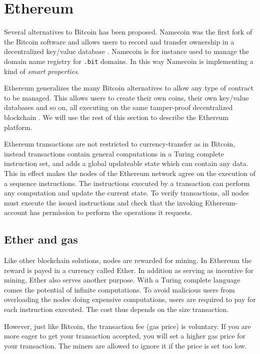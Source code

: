 \documentclass[oneside,a4paper,10pts,article]{memoir}
\begin{document}
\section{Ethereum}
Several alternatives to Bitcoin has been proposed. Namecoin was the
first fork of the Bitcoin software and allows users to record and
transfer ownership in a decentralized key/value database
\cite{namecoin}. Namecoin is for instance used to manage the domain
name registry for \texttt{.bit} domains. In this way Namecoin is
implementing a kind of \textit{smart properties}.

Ethereum generalizes the many Bitcoin alternatives to allow any type
of contract to be managed. This allows users to create their own
coins, their own key/value databases and so on, all executing on the
same tamper-proof decentralized blockchain \cite{buterin2013ethereum,
  wood2014ethereum}. We will use the rest of this section to describe
the Ethereum platform.

Ethereum transactions are not restricted to currency-transfer as in
Bitcoin, instead transactions contain general computations in a Turing
complete instruction set, and adds a global updateable state which can
contain any data. This in effect makes the nodes of the Ethereum
network agree on the execution of a sequence instructions. The
instructions executed by a transaction can perform any computation and
update the current state. To verify transactions, all nodes must
execute the issued instructions and check that the invoking
Ethereum-account has permission to perform the operations it requests.

\subsection{Ether and gas}
Like other blockchain solutions, nodes are rewarded for mining. In
Ethereum the reward is payed in a currency called Ether. In addition
as serving as incentive for mining, Ether also serves another
purpose. With a Turing complete language comes the potential of
infinite computations. To avoid malicious users from overloading the
nodes doing expensive computations, users are required to pay for each
instruction executed. The cost thus depends on the size transaction.

However, just like Bitcoin, the transaction fee (gas price) is
voluntary. If you are more eager to get your transaction accepted, you
will set a higher gas price for your transaction. The miners are
allowed to ignore it if the price is set too low.
\end{document}
